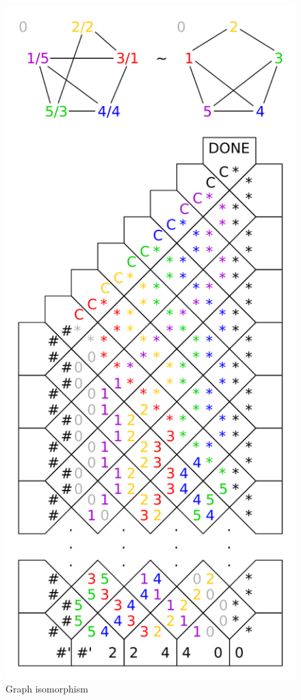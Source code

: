 \begin{figure}[h]
\begin{center}
	\includegraphics[scale=0.85]{./figures/isomorphism/isomorphism.pdf}
	\caption{Graph isomorphism}
\end{center}
\end{figure}
